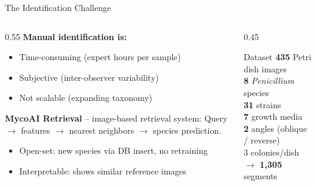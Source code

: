 \documentclass[aspectratio=169]{beamer}
\begin{document}
\begin{frame}{The Identification Challenge}
  \begin{columns}[T]
    \begin{column}{0.55\textwidth}
      \textbf{Manual identification is:}
      \begin{itemize}
        \item Time-consuming (expert hours per sample)
        \item Subjective (inter-observer variability)
        \item Not scalable (expanding taxonomy)
      \end{itemize}

      \textbf{MycoAI Retrieval} -- image-based retrieval system:
      Query $\rightarrow$ features $\rightarrow$ nearest neighbors $\rightarrow$ species prediction.

      \begin{itemize}
        \item Open-set: new species via DB insert, no retraining
        \item Interpretable: shows similar reference images
      \end{itemize}
    \end{column}
    \begin{column}{0.45\textwidth}
      \begin{block}{Dataset}
        \textbf{435} Petri dish images \\
        \textbf{8} \textit{Penicillium} species \\
        \textbf{31} strains \\
        \textbf{7} growth media \\
        \textbf{2} angles (oblique / reverse) \\
        3 colonies/dish $\rightarrow$ \textbf{1,305} segments
      \end{block}
    \end{column}
  \end{columns}
\end{frame}
\end{document}

